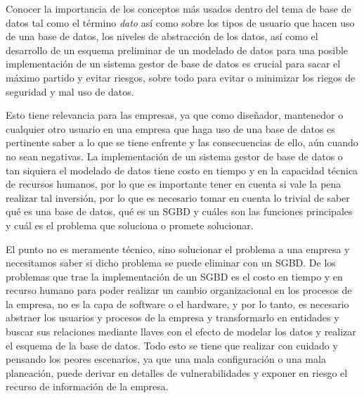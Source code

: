 \documentclass[12pt]{article}
\begin{document}
Conocer la importancia de los conceptos más usados dentro del tema de base de datos tal como el término \textit{dato} así como sobre los tipos de usuario que hacen uso de una base de datos, los niveles de abstracción de los datos, así como el desarrollo de un esquema preliminar de un modelado de datos para una posible implementación de un sistema gestor de base de datos es crucial para sacar el máximo partido y evitar riesgos, sobre todo para evitar o minimizar los riegos de seguridad y mal uso de datos.
\newline

Esto tiene relevancia para las empresas, ya que como diseñador, mantenedor o cualquier otro usuario en una empresa que haga uso de una base de datos es pertinente saber a lo que se tiene enfrente y las consecuencias de ello, aún cuando no sean negativas. La implementación de un sistema gestor de base de datos o tan siquiera el modelado de datos tiene costo en tiempo y en la capacidad técnica de recursos humanos, por lo que es importante tener en cuenta si vale la pena realizar tal inversión, por lo que es necesario tomar en cuenta lo trivial de saber qué es una base de datos, qué es un SGBD y cuáles son las funciones principales y cuál es el problema que soluciona o promete solucionar.
\newline

El punto no es meramente técnico, sino solucionar el problema a una empresa y necesitamos saber si dicho problema se puede eliminar con un SGBD. De los problemas que trae la implementación de un SGBD es el costo en tiempo y en recurso humano para poder realizar un cambio organizacional en los procesos de la empresa, no es la capa de software o el hardware, y por lo tanto, es necesario abstraer los usuarios y procesos de la empresa y transformarlo en entidades y buscar sus relaciones mediante llaves con el efecto de modelar los datos y realizar el esquema de la base de datos. Todo esto se tiene que realizar con cuidado y pensando los peores escenarios, ya que una mala configuración o una mala planeación, puede derivar en detalles de vulnerabilidades y exponer en riesgo el recurso de información de la empresa.
\newpage



\printbibliography[heading=bibintoc, title={Referencias}]
\newpage

\listoftables
\newpage
\end{document}

